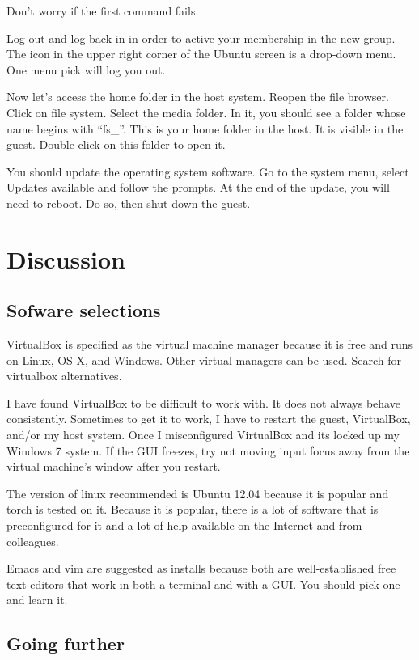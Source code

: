 \documentclass{article}
\begin{document}
Don't worry if the first command fails.


Log out and log back in in order to active your membership in the new
group. The icon in the upper right corner of the
Ubuntu screen is a drop-down menu. One menu pick will log you out.

Now let's access the home folder in the host system. Reopen the file
browser. Click on file system. Select the media folder. In it, you
should see a folder whose name begins with ``fs\_''. This is your home
folder in the host. It is visible in the guest. Double click on this
folder to open it. 

You should update the operating system software. Go to the system menu,
select Updates available and follow the prompts. At the end of the
update, you will need to reboot. Do so, then shut down the guest.



\section{Discussion}

\subsection{Sofware selections}

VirtualBox is specified as the virtual machine manager because it is
free and runs on Linux, OS X, and Windows. Other virtual managers can be
used. Search for virtualbox alternatives.

I have found VirtualBox to be difficult to work with. It does not always behave
consistently. Sometimes to get it to work, I have to restart the guest,
VirtualBox, and/or my host  system. Once I misconfigured VirtualBox and its
locked up my Windows 7 system. If the GUI freezes, try not moving input
focus away from the virtual machine's window after you restart.

The version of linux recommended is Ubuntu 12.04 because it is popular
and torch is tested on it. Because it is popular, there is a lot of
software that is preconfigured for it and a lot of help available on the
Internet and from colleagues. 

Emacs and vim are suggested as installs because both are
well-established free text editors that work in both a terminal and with
a GUI. You should pick one and learn it.


\subsection{Going further}
\end{document}

